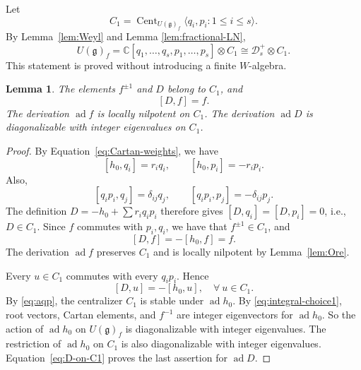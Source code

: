 \documentclass[12pt,a4paper]{amsart}
\numberwithin{equation}{section}
\newtheorem{lemma}[theorem]{Lemma}
\theoremstyle{definition}
\theoremstyle{remark}
\newtheorem{example}[theorem]{Example}
\newcommand{\C}{\mathbb{C}}
\newcommand{\g}{\mathfrak g}
\newcommand{\D}{\mathcal D}
\newcommand{\Z}{\mathbb Z}
\newcommand{\ad}{\operatorname{ad}}
\newcommand{\Cent}{\operatorname{Cent}}
\newcommand{\Uf}{U(\g)_f}
\begin{document}
Let
\begin{equation}\label{eq:C1}
 C_1=\Cent_{\Uf}\langle q_i,p_i:1\leq i\leq s\rangle.
\end{equation}
By Lemma~\ref{lem:Weyl} and Lemma \ref{lem:fractional-LN}, 
\begin{equation}\label{eq:first-splitting}
 \Uf=\C[q_1,\dots,q_s,p_1,\dots,p_s]\otimes C_1\cong \D^+_s\otimes C_1.
\end{equation}
This statement is proved without introducing a finite \(W\)-algebra.

\begin{lemma}\label{lem:D-properties}
The elements \(f^{\pm1}\) and \(D\) belong to \(C_1\), and
\[
 [D,f]=f.
\]
The derivation \(\ad f\) is locally nilpotent on \(C_1\).
The derivation \(\ad D\) is diagonalizable with integer eigenvalues
on \(C_1\).
\end{lemma}

\begin{proof}
By Equation~\eqref{eq:Cartan-weights}, we have
\begin{equation}\label{eq:aqp}
 [h_0,q_i]=r_iq_i,\qquad [h_0,p_i]=-r_ip_i.
\end{equation}
Also,
\[
 [q_ip_i,q_j]=\delta_{ij}q_j,\qquad
 [q_ip_i,p_j]=-\delta_{ij}p_j.
\]
The definition \(D=-h_0+\sum r_iq_ip_i\) therefore gives
\([D,q_i]=[D,p_i]=0\), i.e., $D\in C_1$.
Since \(f\) commutes with $p_i,q_i$,
we have that \(f^{\pm1}\in C_1\), and
\[
 [D,f]=-[h_0,f]=f.
\]
The derivation \(\ad f\) preserves \(C_1\) and is locally nilpotent
by Lemma~\ref{lem:Ore}.

Every \(u\in C_1\) commutes with every \(q_ip_i\). Hence
\begin{equation}\label{eq:D-on-C1}
 [D,u]=-[h_0,u],\quad \forall\ u\in C_1.
\end{equation}
By \eqref{eq:aqp}, the centralizer \(C_1\) is stable under \(\ad h_0\). By \eqref{eq:integral-choice1}, root vectors, Cartan elements, and \(f^{-1}\) are integer eigenvectors
for \(\ad h_0\). So the action of $\ad h_0$ on $\Uf$ is
diagonalizable with integer eigenvalues. The restriction of
$\ad h_0$ on $C_1$ is also
diagonalizable with integer eigenvalues.
Equation~\eqref{eq:D-on-C1} proves the last assertion for $\ad D$.
\end{proof}

\end{document}
